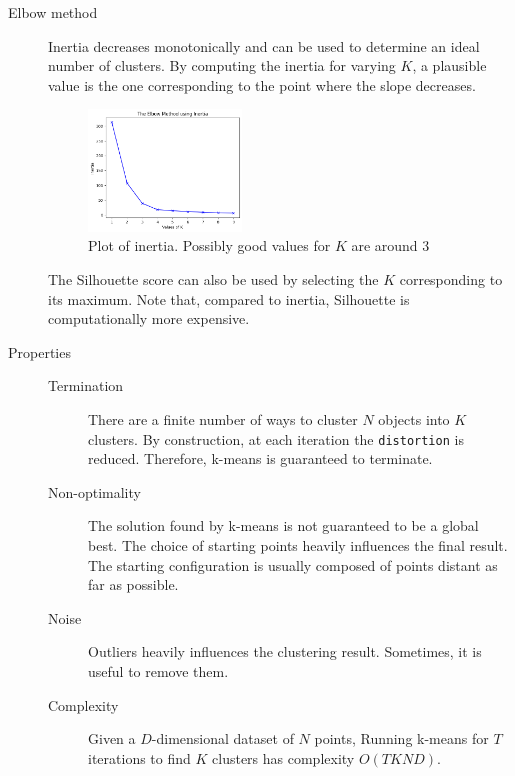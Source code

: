 \begin{description}
    \item[Elbow method]
        Inertia decreases monotonically and can be used to determine an ideal number of clusters.
        By computing the inertia for varying $K$, a plausible value is the one corresponding to the point where the slope decreases.
        \begin{figure}[H]
            \centering
            \includegraphics[width=0.4\textwidth]{img/elbow_method.png}
            \caption{Plot of inertia. Possibly good values for $K$ are around 3}
        \end{figure}

        The Silhouette score can also be used by selecting the $K$ corresponding to its maximum.
        Note that, compared to inertia, Silhouette is computationally more expensive.

    \item[Properties] \phantom{}
        \begin{description}
            \item[Termination] 
                There are a finite number of ways to cluster $N$ objects into $K$ clusters.
                By construction, at each iteration the \texttt{distortion} is reduced.
                Therefore, k-means is guaranteed to terminate.

            \item[Non-optimality] 
                The solution found by k-means is not guaranteed to be a global best.
                The choice of starting points heavily influences the final result. 
                The starting configuration is usually composed of points distant as far as possible.

            \item[Noise]
                Outliers heavily influences the clustering result. Sometimes, it is useful to remove them.

            \item[Complexity]
                Given a $D$-dimensional dataset of $N$ points,
                Running k-means for $T$ iterations to find $K$ clusters has complexity $O(TKND)$.
        \end{description}
\end{description}



